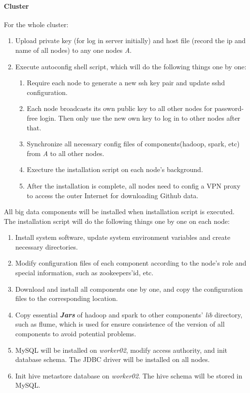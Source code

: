 \paragraph*{Cluster}
For the whole cluster:
\begin{enumerate}
    \item Upload private key (for log in server initially) and host file (record the ip and name of all nodes) to any one nodes \textit{A}.
    \item Execute autoconfig shell script, which will do the following things one by one:
    \begin{enumerate}
        \item Require each node to generate a new ssh key pair and update sshd configuration.
        \item Each node broadcasts its own public key to all other nodes for password-free login. Then only use the new own key to log in to other nodes after that.
        \item Synchronize all necessary config files of components(hadoop, spark, etc) from \textit{A} to all other nodes.
        \item Execture the installation script on each node's background.
        \item After the installation is complete, all nodes need to config a VPN proxy to access the outer Internet for downloading Github data.
    \end{enumerate}
\end{enumerate}

All big data components will be installed when installation script is executed. The installation script will do the following things one by one on each node:
\begin{enumerate}
    \item Install system software, update system environment variables and create necessary directories.
    \item Modify configuration files of each component according to the node's role and special information, such as zookeepers'id, etc.
    \item Download and install all components one by one, and copy the configuration files to the corresponding location.
    \item Copy essential \textbf{\textit{Jars}} of hadoop and spark to other components' \textit{lib} directory, such as flume, which is used for ensure consistence of the version of all components to avoid potential problems.
    \item MySQL will be installed on \textit{worker02}, modify access authority, and init database schema. The JDBC driver will be installed on all nodes.
    \item Init hive metastore database on \textit{worker02}. The hive schema will be stored in MySQL.
\end{enumerate}



